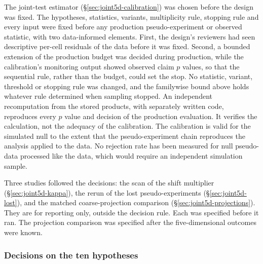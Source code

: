 The joint-test estimator (\S\ref{sec:joint5d-calibration}) was chosen before the design was fixed. The hypotheses, statistics, variants, multiplicity rule, stopping rule and every input were fixed before any production pseudo-experiment or observed statistic, with two data-informed elements. First, the design's reviewers had seen descriptive per-cell residuals of the data before it was fixed. Second, a bounded extension of the production budget was decided during production, while the calibration's monitoring output showed observed claim $p$ values, so that the sequential rule, rather than the budget, could set the stop. No statistic, variant, threshold or stopping rule was changed, and the familywise bound above holds whatever rule determined when sampling stopped. An independent recomputation from the stored products, with separately written code, reproduces every $p$ value and decision of the production evaluation. It verifies the calculation, not the adequacy of the calibration. The calibration is valid for the simulated null to the extent that the pseudo-experiment chain reproduces the analysis applied to the data. No rejection rate has been measured for null pseudo-data processed like the data, which would require an independent simulation sample.

Three studies followed the decisions: the scan of the shift multiplier (\S\ref{sec:joint5d-kappa}), the rerun of the lost pseudo-experiments (\S\ref{sec:joint5d-lost}), and the matched coarse-projection comparison (\S\ref{sec:joint5d-projections}). They are for reporting only, outside the decision rule. Each was specified before it ran. The projection comparison was specified after the five-dimensional outcomes were known.

\subsubsection{Decisions on the ten hypotheses}

